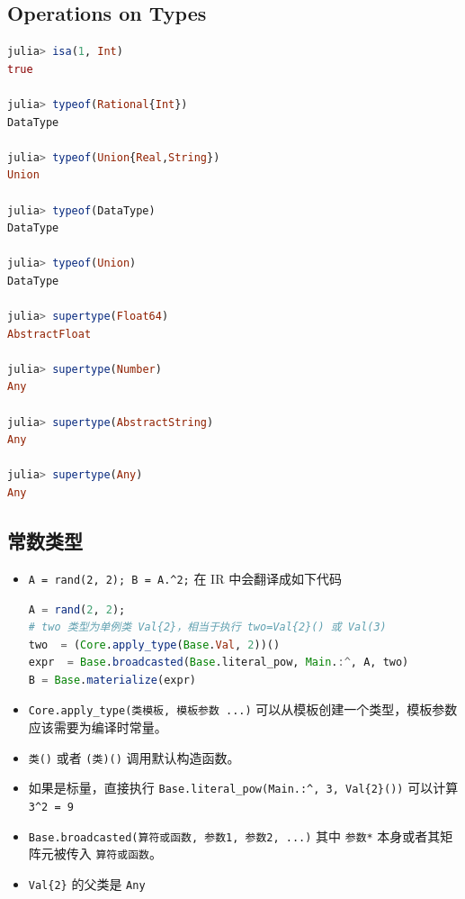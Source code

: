 \subsection{Operations on Types}
\begin{lstlisting}[language=julia]
julia> isa(1, Int)
true

julia> typeof(Rational{Int})
DataType

julia> typeof(Union{Real,String})
Union

julia> typeof(DataType)
DataType

julia> typeof(Union)
DataType

julia> supertype(Float64)
AbstractFloat

julia> supertype(Number)
Any

julia> supertype(AbstractString)
Any

julia> supertype(Any)
Any
\end{lstlisting}

\subsection{常数类型}
\begin{itemize}
\item \verb`A = rand(2, 2); B = A.^2;` 在 IR 中会翻译成如下代码
\begin{lstlisting}[language=julia]
A = rand(2, 2);
# two 类型为单例类 Val{2}，相当于执行 two=Val{2}() 或 Val(3)
two  = (Core.apply_type(Base.Val, 2))()
expr  = Base.broadcasted(Base.literal_pow, Main.:^, A, two)
B = Base.materialize(expr)
\end{lstlisting}
\item \verb`Core.apply_type(类模板, 模板参数 ...)` 可以从模板创建一个类型，模板参数应该需要为编译时常量。
\item \verb`类()` 或者 \verb`(类)()` 调用默认构造函数。
\item 如果是标量，直接执行 \verb`Base.literal_pow(Main.:^, 3, Val{2}())` 可以计算 \verb`3^2 = 9`
\item \verb`Base.broadcasted(算符或函数, 参数1, 参数2, ...)` 其中 \verb`参数*` 本身或者其矩阵元被传入 \verb`算符或函数`。
\item \verb`Val{2}` 的父类是 \verb`Any`
\end{itemize}
